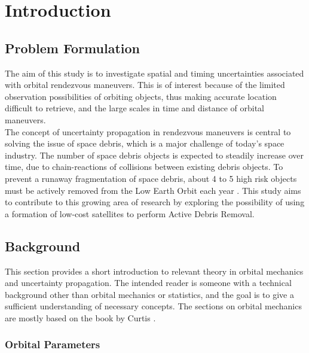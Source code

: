 \section{Introduction}

\subsection{Problem Formulation}

The aim of this study is to investigate spatial and timing uncertainties associated with orbital rendezvous maneuvers. This is of interest because of the limited observation possibilities of orbiting objects, thus making accurate location difficult to retrieve, and the large scales in time and distance of orbital maneuvers. \\

The concept of uncertainty propagation in rendezvous maneuvers is central to solving the issue of space debris, which is a major challenge of today's space industry. The number of space debris objects is expected to steadily increase over time, due to chain-reactions of collisions between existing debris objects. To prevent a runaway fragmentation of space debris, about 4 to 5 high risk objects must be actively removed from the Low Earth Orbit each year \cite{ESA_about_space_debris}. This study aims to contribute to this growing area of research by exploring the possibility of using a formation of low-cost satellites to perform Active Debris Removal. \\








\subsection{Background}

This section provides a short introduction to relevant theory in orbital mechanics and uncertainty propagation. The intended reader is someone with a technical background other than orbital mechanics or statistics, and the goal is to give a sufficient understanding of necessary concepts. The sections on orbital mechanics are mostly based on the book by Curtis \cite{Curtis2009}.


\subsubsection{Orbital Parameters}

